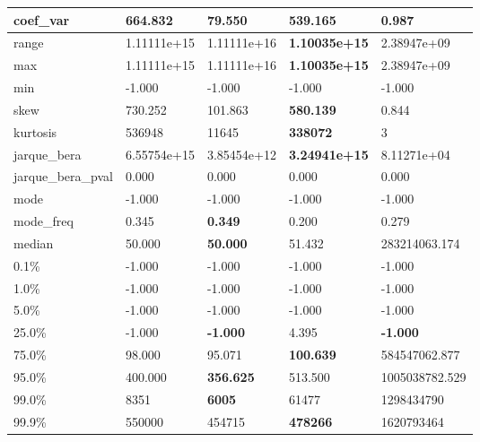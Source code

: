 \begin{table}[H]
\begin{tabular}{|l|m{10em}|m{10em}|m{10em}|m{10em}|}
\hline coef\_var & 664.832 & 79.550 & \bfseries 539.165 & \cellcolor[rgb]{0.9, 0.54, 0.52} 0.987 \\
\hline range & 1.11111e+15 & \cellcolor[rgb]{0.9, 0.54, 0.52} 1.11111e+16 & \bfseries 1.10035e+15 & 2.38947e+09 \\
\hline max & 1.11111e+15 & \cellcolor[rgb]{0.9, 0.54, 0.52} 1.11111e+16 & \bfseries 1.10035e+15 & 2.38947e+09 \\
\hline min & -1.000 & -1.000 & -1.000 & -1.000 \\
\hline skew & 730.252 & 101.863 & \bfseries 580.139 & \cellcolor[rgb]{0.9, 0.54, 0.52} 0.844 \\
\hline kurtosis & 536948 & 11645 & \bfseries 338072 & \cellcolor[rgb]{0.9, 0.54, 0.52} 3 \\
\hline jarque\_bera & 6.55754e+15 & 3.85454e+12 & \bfseries 3.24941e+15 & \cellcolor[rgb]{0.9, 0.54, 0.52} 8.11271e+04 \\
\hline jarque\_bera\_pval & 0.000 & 0.000 & 0.000 & 0.000 \\
\hline mode & -1.000 & -1.000 & -1.000 & -1.000 \\
\hline mode\_freq & 0.345 & \bfseries 0.349 & \cellcolor[rgb]{0.9, 0.54, 0.52} 0.200 & 0.279 \\
\hline median & 50.000 & \bfseries 50.000 & 51.432 & \cellcolor[rgb]{0.9, 0.54, 0.52} 283214063.174 \\
\hline 0.1\% & -1.000 & -1.000 & -1.000 & -1.000 \\
\hline 1.0\% & -1.000 & -1.000 & -1.000 & -1.000 \\
\hline 5.0\% & -1.000 & -1.000 & -1.000 & -1.000 \\
\hline 25.0\% & -1.000 & \bfseries -1.000 & \cellcolor[rgb]{0.9, 0.54, 0.52} 4.395 & \bfseries -1.000 \\
\hline 75.0\% & 98.000 & 95.071 & \bfseries 100.639 & \cellcolor[rgb]{0.9, 0.54, 0.52} 584547062.877 \\
\hline 95.0\% & 400.000 & \bfseries 356.625 & 513.500 & \cellcolor[rgb]{0.9, 0.54, 0.52} 1005038782.529 \\
\hline 99.0\% & 8351 & \bfseries 6005 & 61477 & \cellcolor[rgb]{0.9, 0.54, 0.52} 1298434790 \\
\hline 99.9\% & 550000 & 454715 & \bfseries 478266 & \cellcolor[rgb]{0.9, 0.54, 0.52} 1620793464 \\
\hline
\end{tabular}
\end{table}
